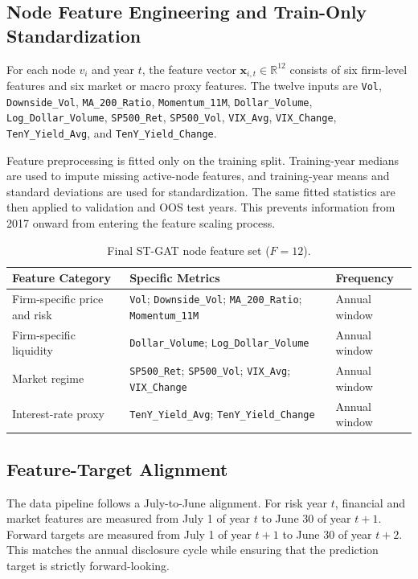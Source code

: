 \documentclass[11pt, a4paper]{article}
\begin{document}
\subsection{Node Feature Engineering and Train-Only Standardization}
For each node $v_i$ and year $t$, the feature vector $\mathbf{x}_{i,t}\in\mathbb{R}^{12}$ consists of six firm-level features and six market or macro proxy features. The twelve inputs are \texttt{Vol}, \texttt{Downside\_Vol}, \texttt{MA\_200\_Ratio}, \texttt{Momentum\_11M}, \texttt{Dollar\_Volume}, \texttt{Log\_Dollar\_Volume}, \texttt{SP500\_Ret}, \texttt{SP500\_Vol}, \texttt{VIX\_Avg}, \texttt{VIX\_Change}, \texttt{TenY\_Yield\_Avg}, and \texttt{TenY\_Yield\_Change}.

Feature preprocessing is fitted only on the training split. Training-year medians are used to impute missing active-node features, and training-year means and standard deviations are used for standardization. The same fitted statistics are then applied to validation and OOS test years. This prevents information from 2017 onward from entering the feature scaling process.

\begin{table}[H]
\centering
\caption{Final ST-GAT node feature set ($F=12$).}
\label{tab:feature_engineering}
\vspace{0.2cm}
\renewcommand{\arraystretch}{1.25}
\small
\begin{tabularx}{\textwidth}{@{}L{3.5cm}Y L{2.6cm}@{}}
\toprule
\textbf{Feature Category} & \textbf{Specific Metrics} & \textbf{Frequency} \\
\midrule
Firm-specific price and risk & \texttt{Vol}; \texttt{Downside\_Vol}; \texttt{MA\_200\_Ratio}; \texttt{Momentum\_11M} & Annual window \\
Firm-specific liquidity & \texttt{Dollar\_Volume}; \texttt{Log\_Dollar\_Volume} & Annual window \\
Market regime & \texttt{SP500\_Ret}; \texttt{SP500\_Vol}; \texttt{VIX\_Avg}; \texttt{VIX\_Change} & Annual window \\
Interest-rate proxy & \texttt{TenY\_Yield\_Avg}; \texttt{TenY\_Yield\_Change} & Annual window \\
\bottomrule
\end{tabularx}
\end{table}

\subsection{Feature-Target Alignment}
The data pipeline follows a July-to-June alignment. For risk year $t$, financial and market features are measured from July 1 of year $t$ to June 30 of year $t+1$. Forward targets are measured from July 1 of year $t+1$ to June 30 of year $t+2$. This matches the annual disclosure cycle while ensuring that the prediction target is strictly forward-looking.
\end{document}

